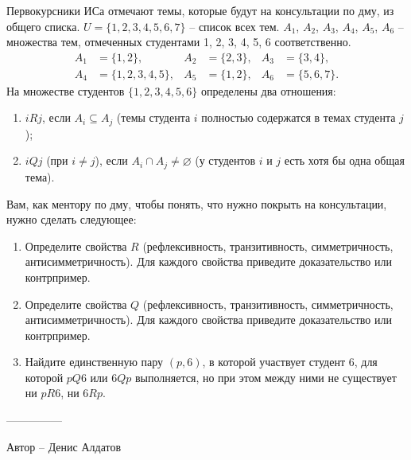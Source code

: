 \question
Первокурсники ИСа отмечают темы, которые будут на консультации по дму, из общего списка. $U = \{1, 2, 3, 4, 5, 6, 7\}$ -- список всех тем. $A_1$, $A_2$, $A_3$, $A_4$, $A_5$, $A_6$ -- множества тем, отмеченных студентами 1, 2, 3, 4, 5, 6 соответственно.
\\
\begin{align*}
    A_1 &= \{1, 2\}, & A_2 &= \{2, 3\}, & A_3 &= \{3, 4\}, \\
    A_4 &= \{1, 2, 3, 4, 5\}, & A_5 &= \{1, 2\}, & A_6 &= \{5, 6, 7\}.
\end{align*}
На множестве студентов $\{1, 2, 3, 4, 5, 6\}$ определены два отношения:
\begin{enumerate}
    \renewcommand{\labelenumi}{\arabic{enumi})}
    \item $iRj$, если $A_i \subseteq A_j$ (темы студента $i$ полностью содержатся в темах студента $j$);
    \item $iQj$ (при $i \ne j$), если $A_i \cap A_j \ne \varnothing$ (у студентов $i$ и $j$ есть хотя бы одна общая тема).
\end{enumerate}
Вам, как ментору по дму, чтобы понять, что нужно покрыть на консультации, нужно сделать следующее:
\begin{enumerate}
    \renewcommand{\labelenumi}{\alph{enumi})}
    \item Определите свойства $R$ (рефлексивность, транзитивность, симметричность, антисимметричность). Для каждого свойства приведите доказательство или контрпример.
    \item Определите свойства $Q$ (рефлексивность, транзитивность, симметричность, антисимметричность). Для каждого свойства приведите доказательство или контрпример.
    \item Найдите единственную пару $(p, 6)$, в которой участвует студент 6, для которой $pQ6$ или $6Qp$ выполняется, но при этом между ними не существует ни $pR6$, ни $6Rp$.
\end{enumerate}

---------------

Автор -- Денис Алдатов
